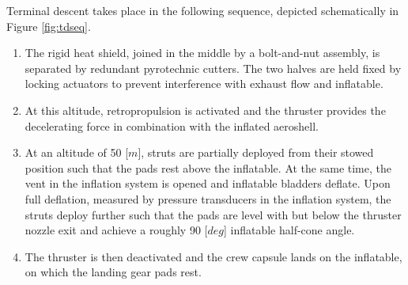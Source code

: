 Terminal descent takes place in the following sequence, depicted schematically in Figure \ref{fig:tdseq}.
\begin{enumerate}
\item The rigid heat shield, joined in the middle by a bolt-and-nut assembly, is separated by redundant pyrotechnic cutters. The two halves are held fixed by locking actuators to prevent interference with exhaust flow and inflatable.
\item At this altitude, retropropulsion is activated and the thruster provides the decelerating force in combination with the inflated aeroshell.
\item At an altitude of 50 [$m$], struts are partially deployed from their stowed position such that the pads rest above the inflatable. At the same time, the vent in the inflation system is opened and inflatable bladders deflate. Upon full deflation, measured by pressure transducers in the inflation system, the struts deploy further such that the pads are level with but below the thruster nozzle exit and achieve a roughly 90 [$deg$] inflatable half-cone angle.
\item The thruster is then deactivated and the crew capsule lands on the inflatable, on which the landing gear pads rest.
\end{enumerate}
